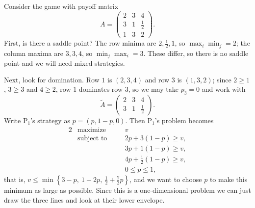 \documentclass[a4paper]{scrartcl}
\begin{document}
\begin{example}
    Consider the game with payoff matrix
    $$
    A = \begin{pmatrix} 2 & 3 & 4\\ 3 & 1 & \frac12\\ 1 & 3 & 2\end{pmatrix}.
    $$
    First, is there a saddle point? The row minima are $2, \frac12, 1$, so $\max_i\min_j = 2$; the column maxima are $3, 3, 4$, so $\min_j\max_i = 3$. These differ, so there is no saddle point and we will need mixed strategies.

    Next, look for domination. Row $1$ is $(2,3,4)$ and row $3$ is $(1,3,2)$; since $2 \geq 1$, $3\geq 3$ and $4 \geq 2$, row $1$ dominates row $3$, so we may take $p_3 = 0$ and work with
    $$
    \tilde A = \begin{pmatrix}2 & 3 & 4\\3&1&\frac12\end{pmatrix}.
    $$
    Write $\mathrm{P}_1$'s strategy as $p = (p, 1-p, 0)$. Then $\mathrm{P}_1$'s problem becomes
    \begin{alignat*}{2}
        & \text{maximize} \quad && v \\
        & \text{subject to} \quad && 2p + 3(1-p) \geq v,\\
        & && 3p + 1(1-p) \geq v,\\
        & && 4p + \tfrac12(1-p) \geq v,\\
        & && 0 \leq p \leq 1,
    \end{alignat*}
    that is, $v \leq \min\left\{3 - p,\ 1 + 2p,\ \tfrac12 + \tfrac72 p\right\}$, and we want to choose $p$ to make this minimum as large as possible. Since this is a one-dimensional problem we can just draw the three lines and look at their lower envelope.

\begin{center}
\end{center}


\end{example}
\end{document}

